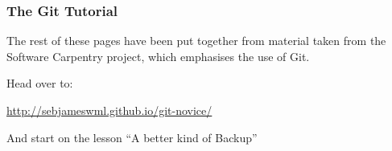 \documentclass{beamer}
\begin{document}
\begin{frame}
  \frametitle{The Git Tutorial}
  The rest of these pages have been put together from material taken
  from the Software Carpentry project, which emphasises the use of
  Git.

  Head over to:

  \url{http://sebjameswml.github.io/git-novice/}

  And start on the lesson ``A better kind of Backup''

\end{frame}
\end{document}
